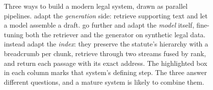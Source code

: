 \begin{figure}[t]
{}
\caption{Three ways to build a modern legal system, drawn as parallel pipelines. \citet{buffa2025}
adapt the \emph{generation} side: retrieve supporting text and let a model assemble a draft.
\citet{ren2026} go further and adapt the \emph{model} itself, fine-tuning both the retriever and the
generator on synthetic legal data. \citet{hamza2026} instead adapt the \emph{index}: they preserve
the statute's hierarchy with a breadcrumb per chunk, retrieve through two streams fused by rank, and
return each passage with its exact address. The highlighted box in each column marks that system's
defining step. The three answer different questions, and a mature system is likely to combine them.}
\label{fig:philosophies}
\end{figure}

